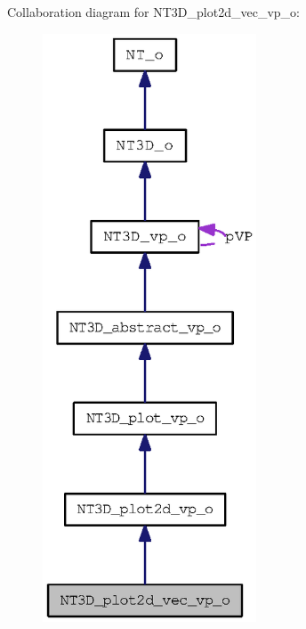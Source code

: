 Collaboration diagram for NT3D\_\-plot2d\_\-vec\_\-vp\_\-o:
\nopagebreak
\begin{figure}[H]
\begin{center}
\leavevmode
\includegraphics[width=180pt]{class_n_t3_d__plot2d__vec__vp__o__coll__graph}
\end{center}
\end{figure}
